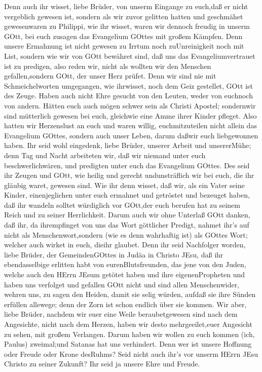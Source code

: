  Denn auch ihr wisset, liebe Brüder, von unserm Eingange zu
euch,daß er nicht vergeblich gewesen ist,  sondern als wir
zuvor gelitten hatten und geschmähet gewesenwaren zu Philippi, wie ihr
wisset, waren wir dennoch freudig in unserm GOtt, bei euch zusagen das
Evangelium GOttes mit großem Kämpfen.  Denn unsere Ermahnung
ist nicht gewesen zu Irrtum noch zuUnreinigkeit noch mit List,
 sondern wie wir von GOtt bewähret sind, daß uns das
Evangeliumvertrauet ist zu predigen, also reden wir, nicht als wollten
wir den Menschen gefallen,sondern GOtt, der unser Herz prüfet.
 Denn wir sind nie mit Schmeichelworten umgegangen, wie
ihrwisset, noch dem Geiz gestellet, GOtt ist des Zeuge. 
Haben auch nicht Ehre gesucht von den Leuten, weder von euchnoch von
andern.  Hätten euch auch mögen schwer sein als Christi
Apostel; sondernwir sind mütterlich gewesen bei euch, gleichwie eine
Amme ihrer Kinder pfleget.  Also hatten wir Herzenslust an
euch und waren willig, euchmitzuteilen nicht allein das Evangelium
GOttes, sondern auch unser Leben, darum daßwir euch liebgewonnen haben.
 Ihr seid wohl eingedenk, liebe Brüder, unserer Arbeit und
unsererMühe; denn Tag und Nacht arbeiteten wir, daß wir niemand unter
euch beschwerlichwären, und predigten unter euch das Evangelium GOttes.
 Des seid ihr Zeugen und GOtt, wie heilig und gerecht
undunsträflich wir bei euch, die ihr gläubig waret, gewesen sind.
 Wie ihr denn wisset, daß wir, als ein Vater seine Kinder,
einenjeglichen unter euch ermahnet und getröstet  und
bezeuget haben, daß ihr wandeln solltet würdiglich vor GOtt,der euch
berufen hat zu seinem Reich und zu seiner Herrlichkeit. 
Darum auch wir ohne Unterlaß GOtt danken, daß ihr, da ihrempfinget von
uns das Wort göttlicher Predigt, nahmet ihr's auf nicht als
Menschenwort,sondern (wie es denn wahrhaftig ist) als GOttes Wort;
welcher auch wirket in euch, dieihr glaubet.  Denn ihr seid
Nachfolger worden, liebe Brüder, der GemeindenGOttes in Judäa in Christo
JEsu, daß ihr ebendasselbige erlitten habt von eurenBlutsfreunden, das
jene von den Juden,  welche auch den HErrn JEsum getötet
haben und ihre eigenenPropheten und haben uns verfolget und gefallen
GOtt nicht und sind allen Menschenwider,  wehren uns, zu
sagen den Heiden, damit sie selig würden, aufdaß sie ihre Sünden
erfüllen allewege; denn der Zorn ist schon endlich über sie kommen.
 Wir aber, liebe Brüder, nachdem wir euer eine Weile
beraubetgewesen sind nach dem Angesichte, nicht nach dem Herzen, haben
wir desto mehrgeeilet,euer Angesicht zu sehen, mit großem Verlangen.
 Darum haben wir wollen zu euch kommen (ich, Paulus)
zweimal;und Satanas hat uns verhindert.  Denn wer ist
unsere Hoffnung oder Freude oder Krone desRuhms? Seid nicht auch ihr's
vor unserm HErrn JEsu Christo zu seiner Zukunft?  Ihr seid
ja unsere Ehre und Freude.

